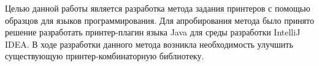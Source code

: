 Целью данной работы является разработка метода задания принтеров с помощью
образцов для языков программирования. 
Для апробирования метода было принято решение разработать принтер-плагин
языка Java для среды разработки IntelliJ IDEA.
В ходе разработки данного метода возникла необходимость улучшить существующую
принтер-комбинаторную библиотеку\cite{swierstra}. 



